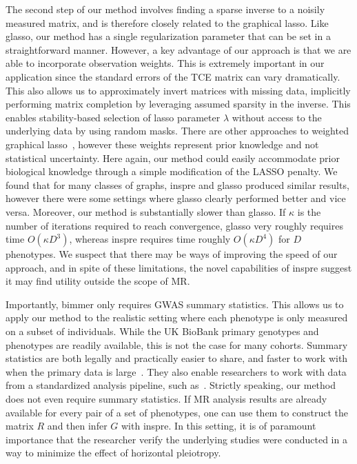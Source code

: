\documentclass{article}
\begin{document}
The second step of our method involves finding a sparse inverse to a noisily measured
matrix, and is therefore closely related to the graphical lasso. Like glasso, our method
 has a single regularization parameter that can be set in a straightforward manner.
However, a key advantage of our approach is that we are able to incorporate
observation weights. This is extremely important in our application since the standard errors
of the TCE matrix can vary dramatically. This also allows us to approximately invert matrices
with missing data, implicitly performing matrix completion by leveraging assumed
sparsity in the inverse. This enables stability-based selection of lasso parameter
 $\lambda$ without access to the underlying data by using random masks.
There are other approaches to weighted graphical lasso~\cite{Li2015,Zuo2017}, however 
these weights represent prior knowledge and not statistical uncertainty.
Here again, our method could easily accommodate prior biological knowledge through a simple
modification of the LASSO penalty.
We found that for many classes of graphs,
inspre and glasso produced similar results, however there were some settings where glasso
clearly performed better and vice versa.
Moreover, our method is substantially slower than glasso. If $\kappa$ is the number
of iterations required to reach convergence, glasso very roughly requires time
$O(\kappa D^3)$, whereas inspre requires time roughly $O(\kappa D^4)$ for $D$ phenotypes. We suspect that
there may be ways of improving the speed of our approach, and in spite of these limitations,
the novel capabilities of inspre suggest it may find utility
outside the scope of MR.

Importantly, bimmer only requires GWAS summary statistics. This allows us to apply our method to
the realistic setting where each phenotype is only measured on a subset of individuals.
While the UK BioBank primary genotypes and phenotypes are readily available,
this is not the case for many cohorts. Summary
statistics are both legally and practically easier to share, and faster to work with when the primary
data is large~\cite{Pasaniuc2017}. They also enable researchers to work with data from a
standardized analysis pipeline, such as~\cite{NealeUKBB}.
Strictly speaking, our method does not even require summary statistics. If
MR analysis results are already available for every pair of a set of phenotypes,
one can use them to construct the matrix $R$ and then infer $G$ with
inspre. In this setting, it is of paramount importance that the researcher verify
the underlying studies were conducted in a way to minimize the effect of
horizontal pleiotropy.
\end{document}
